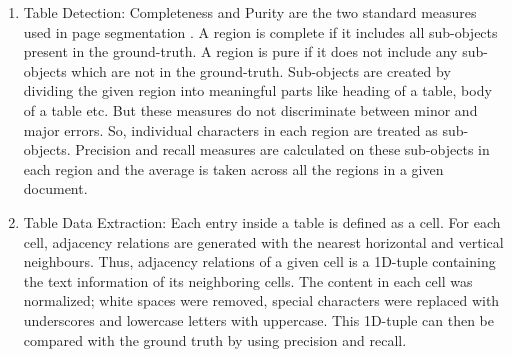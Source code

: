 \documentclass[conference]{IEEEtran}
\begin{document}
{

\begin{enumerate}[label=(\alph*)]
    \item Table Detection: Completeness and Purity are the two standard measures used in page segmentation \cite{e2011metrics}. A region is complete if it includes all sub-objects present in the ground-truth. A region is pure if it does not include any sub-objects which are not in the ground-truth. Sub-objects are created by dividing the given region into meaningful parts like heading of a table, body of a table etc. But these measures do not discriminate between minor and major errors. So, individual characters in each region are treated as sub-objects. Precision and recall measures are calculated on these sub-objects in each region and the average is taken across all the regions in a given document.
    \item Table Data Extraction: Each entry inside a table is defined as a cell. For each cell, adjacency relations are generated with the nearest horizontal and vertical neighbours. Thus, adjacency relations of a given cell is a 1D-tuple containing the text information of its neighboring cells. The content in each cell was normalized; white spaces were removed, special characters were replaced with underscores and lowercase letters with uppercase. This 1D-tuple can then be compared with the ground truth by using precision and recall.
\end{enumerate}

}   
\end{document}
